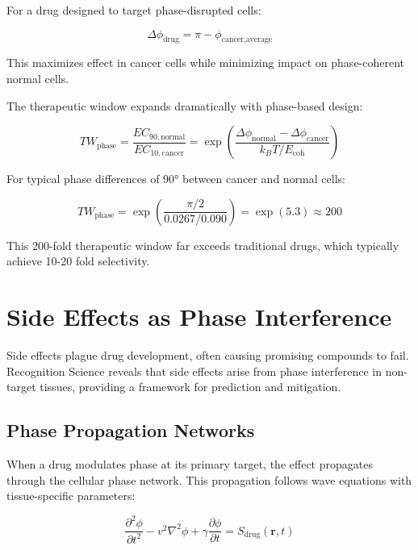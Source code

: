 \documentclass[12pt,a4paper]{report}
\begin{document}
For a drug designed to target phase-disrupted cells:

\begin{equation}
\Delta\phi_{\text{drug}} = \pi - \phi_{\text{cancer,average}}
\end{equation}

This maximizes effect in cancer cells while minimizing impact on phase-coherent normal cells.

The therapeutic window expands dramatically with phase-based design:

\begin{equation}
TW_{\text{phase}} = \frac{EC_{90,\text{normal}}}{EC_{10,\text{cancer}}} = \exp\left(\frac{\Delta\phi_{\text{normal}} - \Delta\phi_{\text{cancer}}}{k_B T/E_{\text{coh}}}\right)
\end{equation}

For typical phase differences of 90° between cancer and normal cells:

\begin{equation}
TW_{\text{phase}} = \exp\left(\frac{\pi/2}{0.0267/0.090}\right) = \exp(5.3) \approx 200
\end{equation}

This 200-fold therapeutic window far exceeds traditional drugs, which typically achieve 10-20 fold selectivity.

\section{Side Effects as Phase Interference}

Side effects plague drug development, often causing promising compounds to fail. Recognition Science reveals that side effects arise from phase interference in non-target tissues, providing a framework for prediction and mitigation.

\subsection{Phase Propagation Networks}

When a drug modulates phase at its primary target, the effect propagates through the cellular phase network. This propagation follows wave equations with tissue-specific parameters:

\begin{equation}
\frac{\partial^2 \phi}{\partial t^2} - v^2 \nabla^2 \phi + \gamma \frac{\partial \phi}{\partial t} = S_{\text{drug}}(\mathbf{r}, t)
\end{equation}
\end{document}
